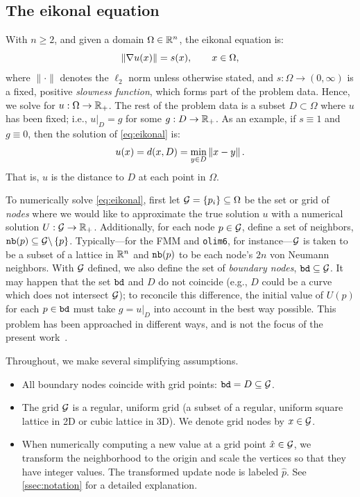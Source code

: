 \documentclass{article}
\begin{document}
\subsection{The eikonal equation}

With $n \geq 2$, and given a domain $\Omega \in \mathbb{R}^n$, the eikonal
equation is:
\begin{equation}\label{eq:eikonal}
  \left\|\nabla u(x)\right\| = s(x), \qquad x \in \Omega,
\end{equation}
where $\|\cdot\|$ denotes the $\ell_2$ norm unless otherwise stated,
and $s : \Omega \to (0, \infty)$ is a fixed, positive \emph{slowness
  function}, which forms part of the problem data. Hence, we solve for
$u : \Omega \to \mathbb{R}_+$. The rest of the problem data is a subset
$D \subset \Omega$ where $u$ has been fixed; i.e.,
$\left. u \right|_D = g$ for some $g : D \to \mathbb{R}_+$. As an example, if
$s \equiv 1$ and $g \equiv 0$, then the solution of \cref{eq:eikonal}
is:
\begin{equation}
  \label{eq:distance-to-Omega}
  u(x) = d(x, D) = \min_{y \in D} \left\|x - y\right\|.
\end{equation}
That is, $u$ is the distance to $D$ at each point in
$\Omega$. 

To numerically solve \cref{eq:eikonal}, first let
$\mathcal{G} = \{p_i\} \subseteq \Omega$ be the set or grid of \emph{nodes}
where we would like to approximate the true solution $u$ with a
numerical solution $U : \mathcal{G} \to \mathbb{R}_+$. Additionally, for each node
$p \in \mathcal{G}$, define a set of neighbors,
$\texttt{nb}(p) \subseteq \mathcal{G} \backslash \left\{p\right\}$. Typically---for the FMM
and \texttt{olim6}, for instance---$\mathcal{G}$ is taken to be a subset of
a lattice in $\mathbb{R}^n$ and $\texttt{nb}(p)$ to be each node's $2n$ von Neumann
neighbors. With $\mathcal{G}$ defined, we also define the set of
\emph{boundary nodes}, $\texttt{bd} \subseteq \mathcal{G}$. It may happen that
the set $\texttt{bd}$ and $D$ do not coincide (e.g., $D$ could be a
curve which does not intersect $\mathcal{G}$); to reconcile this difference,
the initial value of $U(p)$ for each $p \in \texttt{bd}$ must take
$g = \left. u \right|_D$ into account in the best way possible. This
problem has been approached in different ways, and is not the focus of
the present work~\cite{chopp2001some}.

Throughout, we make several simplifying assumptions.
\begin{itemize}
\item All boundary nodes coincide with grid points:
  $\texttt{bd} = D \subseteq \mathcal{G}$.
\item The grid $\mathcal{G}$ is a regular, uniform grid (a subset of a
  regular, uniform square lattice in 2D or cubic lattice in 3D). We
  denote grid nodes by $x \in \mathcal{G}$.
\item When numerically computing a new value at a grid point
  $\hat{x} \in \mathcal{G}$, we transform the neighborhood to the origin and
  scale the vertices so that they have integer values. The transformed
  update node is labeled $\hat{p}$. See \cref{ssec:notation} for a
  detailed explanation.
\end{itemize}
\end{document}
